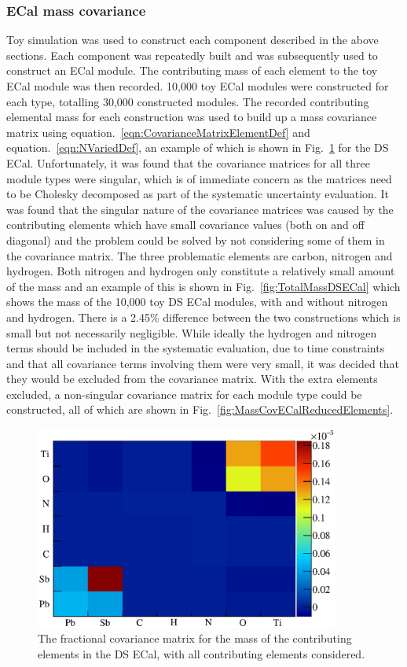 \subsubsection{ECal mass covariance}
\label{subsubsec:ECalMassCovariance}
Toy simulation was used to construct each component described in the above sections.  Each component was repeatedly built and was subsequently used to construct an ECal module.  The contributing mass of each element to the toy ECal module was then recorded.  10,000 toy ECal modules were constructed for each type, totalling 30,000 constructed modules.  The recorded contributing elemental mass for each construction was used to build up a mass covariance matrix using equation.~\ref{eqn:CovarianceMatrixElementDef} and equation.~\ref{eqn:NVariedDef}, an example of which is shown in Fig.~\ref{fig:MassCovDSECalAllElements} for the DS ECal.  Unfortunately, it was found that the covariance matrices for all three module types were singular, which is of immediate concern as the matrices need to be Cholesky decomposed as part of the systematic uncertainty evaluation.  It was found that the singular nature of the covariance matrices was caused by the contributing elements which have small covariance values (both on and off diagonal) and the problem could be solved by not considering some of them in the covariance matrix.  The three problematic elements are carbon, nitrogen and hydrogen.  Both nitrogen and hydrogen only constitute a relatively small amount of the mass and an example of this is shown in Fig.~\ref{fig:TotalMassDSECal} which shows the mass of the 10,000 toy DS ECal modules, with and without nitrogen and hydrogen.  There is a 2.45$\%$ difference between the two constructions which is small but not necessarily negligible.  While ideally the hydrogen and nitrogen terms should be included in the systematic evaluation, due to time constraints and that all covariance terms involving them were very small, it was decided that they would be excluded from the covariance matrix.  With the extra elements excluded, a non-singular covariance matrix for each module type could be constructed, all of which are shown in Fig.~\ref{fig:MassCovECalReducedElements}.
\begin{figure}
  \centering
  \includegraphics[width=10cm]{images/measurement/systematics/detector/mass/MassCov_DSECal_AllElements.eps}
  \caption{The fractional covariance matrix for the mass of the contributing elements in the DS ECal, with all contributing elements considered.}
  \label{fig:MassCovDSECalAllElements}
\end{figure}
